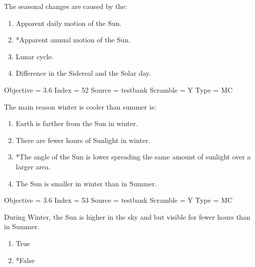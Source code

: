\documentclass[11pt]{article}
\begin{document}
\begin{enumerate}
\begin{minipage}{\textwidth}
\begin{minipage}{\textwidth}
\item The seasonal changes are caused by the:
\begin{enumerate} 
\setlength{\itemsep}{1pt} 
\setlength{\parskip}{0pt} 
\setlength{\parsep}{0pt}
\setlength{\multicolsep}{1pt} 
\item Apparent daily motion of the Sun.
\item *Apparent annual motion of the Sun.
\item Lunar cycle.
\item Difference in the Sidereal and the Solar day.
\end{enumerate} 
Objective = 3.6
Index = 52
Source = testbank
Scramble = Y
Type = MC
\end{minipage}
\end{minipage}
\vskip 0.20in

\begin{minipage}{\textwidth}
\begin{minipage}{\textwidth}
\item The main reason winter is cooler than summer is:
\begin{enumerate} 
\setlength{\itemsep}{1pt} 
\setlength{\parskip}{0pt} 
\setlength{\parsep}{0pt}
\setlength{\multicolsep}{1pt} 
\item Earth is farther from the Sun in winter.
\item There are fewer hours of Sunlight in winter.
\item *The angle of the Sun is lower spreading the same amount of sunlight over a larger area.
\item The Sun is smaller in winter than in Summer.
\end{enumerate} 
Objective = 3.6
Index = 53
Source = testbank
Scramble = Y
Type = MC
\end{minipage}
\end{minipage}
\vskip 0.20in

\begin{minipage}{\textwidth}
\begin{minipage}{\textwidth}
\item During Winter, the Sun is higher in the sky and but visible for fewer hours than in Summer.
\begin{multicols}{3}
\begin{enumerate} 
\setlength{\itemsep}{1pt} 
\setlength{\parskip}{0pt} 
\setlength{\parsep}{0pt}
\setlength{\multicolsep}{1pt} 
\item True
\item *False
\end{enumerate} 
\vfill 
\end{multicols}


\end{minipage}
\end{minipage}
\end{enumerate}
\end{document}

